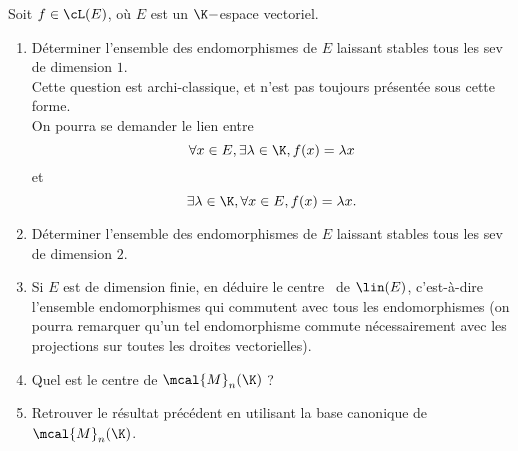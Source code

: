 Soit $f\in \cL(E)$, où $E$ est un $\K-$espace vectoriel.

\begin{enumerate}
\item Déterminer l'ensemble des endomorphismes de $E$ laissant stables tous les sev de dimension $1$.\\

Cette question est archi-classique, et n'est pas toujours présentée sous cette forme.\\
On pourra se demander le lien entre
$$\forall x\in E,\exists \lambda \in \K,f(x)=\lambda x$$
et
$$\exists \lambda \in \K,\forall x\in E,f(x)=\lambda x.$$

\item Déterminer l'ensemble des endomorphismes de $E$ laissant stables tous les sev de dimension $2$.
\item Si $E$ est de dimension finie, en déduire le \og centre \fg\ de $\lin(E)$, c'est-à-dire l'ensemble endomorphismes qui commutent avec tous les endomorphismes (on pourra remarquer qu'un tel endomorphisme commute nécessairement avec les projections sur toutes les droites vectorielles).
\item Quel est le centre de $\mcal{M}_n(\K)$ ?
\item Retrouver le résultat précédent en utilisant la base canonique de $\mcal{M}_n(\K)$.
\end{enumerate}
